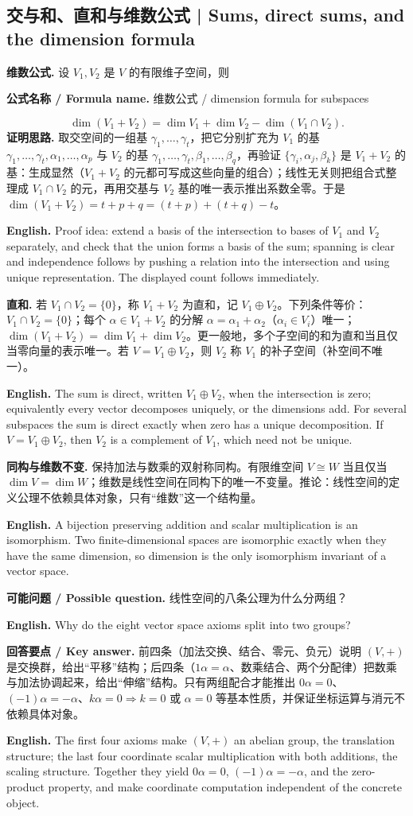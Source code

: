\documentclass[UTF8,11pt,a4paper]{ctexart}
\newcommand{\EN}[1]{\par\noindent\textbf{English.} #1\par}
\newcommand{\FORMULA}[2]{\par\noindent\textbf{公式名称 / Formula name.} #1 / #2\par}
\newcommand{\ASK}[4]{\par\noindent\textbf{可能问题 / Possible question.} #1\par\EN{#2}\noindent\textbf{回答要点 / Key answer.} #3\par\EN{#4}\medskip}
\begin{document}
\subsection{交与和、直和与维数公式 | Sums, direct sums, and the dimension formula}
\noindent\textbf{维数公式.} 设 $V_1,V_2$ 是 $V$ 的有限维子空间，则
\FORMULA{维数公式}{dimension formula for subspaces}
\[
\dim(V_1+V_2)=\dim V_1+\dim V_2-\dim(V_1\cap V_2).
\]
\noindent\textbf{证明思路.} 取交空间的一组基 $\gamma_1,\dots,\gamma_t$，把它分别扩充为 $V_1$ 的基 $\gamma_1,\dots,\gamma_t,\alpha_1,\dots,\alpha_p$ 与 $V_2$ 的基 $\gamma_1,\dots,\gamma_t,\beta_1,\dots,\beta_q$，再验证 $\{\gamma_i,\alpha_j,\beta_k\}$ 是 $V_1+V_2$ 的基：生成显然（$V_1+V_2$ 的元都可写成这些向量的组合）；线性无关则把组合式整理成 $V_1\cap V_2$ 的元，再用交基与 $V_2$ 基的唯一表示推出系数全零。于是 $\dim(V_1+V_2)=t+p+q=(t+p)+(t+q)-t$。
\EN{Proof idea: extend a basis of the intersection to bases of $V_1$ and $V_2$ separately, and check that the union forms a basis of the sum; spanning is clear and independence follows by pushing a relation into the intersection and using unique representation. The displayed count follows immediately.}
\noindent\textbf{直和.} 若 $V_1\cap V_2=\{0\}$，称 $V_1+V_2$ 为直和，记 $V_1\oplus V_2$。下列条件等价：$V_1\cap V_2=\{0\}$；每个 $\alpha\in V_1+V_2$ 的分解 $\alpha=\alpha_1+\alpha_2$（$\alpha_i\in V_i$）唯一；$\dim(V_1+V_2)=\dim V_1+\dim V_2$。更一般地，多个子空间的和为直和当且仅当零向量的表示唯一。若 $V=V_1\oplus V_2$，则 $V_2$ 称 $V_1$ 的补子空间（补空间不唯一）。
\EN{The sum is direct, written $V_1\oplus V_2$, when the intersection is zero; equivalently every vector decomposes uniquely, or the dimensions add. For several subspaces the sum is direct exactly when zero has a unique decomposition. If $V=V_1\oplus V_2$, then $V_2$ is a complement of $V_1$, which need not be unique.}
\noindent\textbf{同构与维数不变.} 保持加法与数乘的双射称同构。有限维空间 $V\cong W$ 当且仅当 $\dim V=\dim W$；维数是线性空间在同构下的唯一不变量。推论：线性空间的定义公理不依赖具体对象，只有“维数”这一个结构量。
\EN{A bijection preserving addition and scalar multiplication is an isomorphism. Two finite-dimensional spaces are isomorphic exactly when they have the same dimension, so dimension is the only isomorphism invariant of a vector space.}
\ASK{线性空间的八条公理为什么分两组？}{Why do the eight vector space axioms split into two groups?}{前四条（加法交换、结合、零元、负元）说明 $(V,+)$ 是交换群，给出“平移”结构；后四条（$1\alpha=\alpha$、数乘结合、两个分配律）把数乘与加法协调起来，给出“伸缩”结构。只有两组配合才能推出 $0\alpha=0$、$(-1)\alpha=-\alpha$、$k\alpha=0\Rightarrow k=0$ 或 $\alpha=0$ 等基本性质，并保证坐标运算与消元不依赖具体对象。}{The first four axioms make $(V,+)$ an abelian group, the translation structure; the last four coordinate scalar multiplication with both additions, the scaling structure. Together they yield $0\alpha=0$, $(-1)\alpha=-\alpha$, and the zero-product property, and make coordinate computation independent of the concrete object.}
\end{document}
